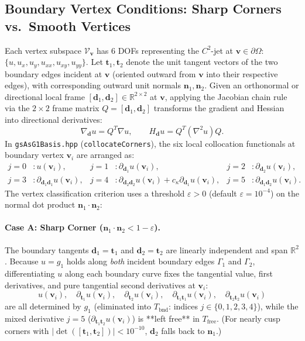 \documentclass[11pt,a4paper]{article}
\newcommand{\R}{\mathbb{R}}
\newcommand{\bn}{\mathbf{n}}
\newcommand{\bt}{\mathbf{t}}
\newcommand{\bv}{\mathbf{v}}
\begin{document}
\subsection{Boundary Vertex Conditions: Sharp Corners vs.\ Smooth Vertices}
Each vertex subspace $\mathcal{V}_{\bv}$ has $6$ DOFs representing the $C^2$-jet at $\bv \in \partial\Omega$:
$\{u, u_x, u_y, u_{xx}, u_{xy}, u_{yy}\}$. Let $\bt_1, \bt_2$ denote the unit tangent vectors of the two boundary edges incident at $\bv$ (oriented outward from $\bv$ into their respective edges), with corresponding outward unit normals $\bn_1, \bn_2$. Given an orthonormal or directional local frame $[\mathbf{d}_1, \mathbf{d}_2] \in \R^{2 \times 2}$ at $\bv$, applying the Jacobian chain rule via the $2 \times 2$ frame matrix $Q = [\mathbf{d}_1, \mathbf{d}_2]$ transforms the gradient and Hessian into directional derivatives:
\begin{equation}
\nabla_{\mathbf{d}} u = Q^T \nabla u, \qquad
H_{\mathbf{d}} u = Q^T (\nabla^2 u) Q.
\end{equation}
In \texttt{gsAsG1Basis.hpp} (\texttt{collocateCorners}), the six local collocation functionals at boundary vertex $\bv_i$ are arranged as:
\begin{equation}
\label{eq:corner_6jet}
\begin{aligned}
j = 0 &: u(\bv_i), &
j = 1 &: \partial_{\mathbf{d}_1} u(\bv_i), &
j = 2 &: \partial_{\mathbf{d}_2} u(\bv_i), \\
j = 3 &: \partial_{\mathbf{d}_1\mathbf{d}_1} u(\bv_i), &
j = 4 &: \partial_{\mathbf{d}_2\mathbf{d}_2} u(\bv_i) + c_\kappa \partial_{\mathbf{d}_1} u(\bv_i), &
j = 5 &: \partial_{\mathbf{d}_1\mathbf{d}_2} u(\bv_i).
\end{aligned}
\end{equation}
The vertex classification criterion uses a threshold $\varepsilon > 0$ (default $\varepsilon = 10^{-4}$) on the normal dot product $\bn_1 \cdot \bn_2$:

\paragraph{Case A: Sharp Corner ($\bn_1 \cdot \bn_2 < 1 - \varepsilon$).}
The boundary tangents $\mathbf{d}_1 = \bt_1$ and $\mathbf{d}_2 = \bt_2$ are linearly independent and span $\R^2$. Because $u = g_1$ holds along \emph{both} incident boundary edges $\Gamma_1$ and $\Gamma_2$, differentiating $u$ along each boundary curve fixes the tangential value, first derivatives, and pure tangential second derivatives at $\bv_i$:
\begin{equation}
u(\bv_i), \quad
\partial_{\bt_1} u(\bv_i), \quad
\partial_{\bt_2} u(\bv_i), \quad
\partial_{\bt_1\bt_1} u(\bv_i), \quad
\partial_{\bt_2\bt_2} u(\bv_i)
\end{equation}
are all determined by $g_1$ (eliminated into $T_{\mathrm{bnd}}$: indices $j \in \{0, 1, 2, 3, 4\}$), while the mixed derivative $j = 5$ ($\partial_{\bt_1\bt_2} u(\bv_i)$) is **left free** in $T_{\mathrm{free}}$. (For nearly cusp corners with $|\det([\bt_1, \bt_2])| < 10^{-10}$, $\mathbf{d}_2$ falls back to $\bn_1$.)
\end{document}
